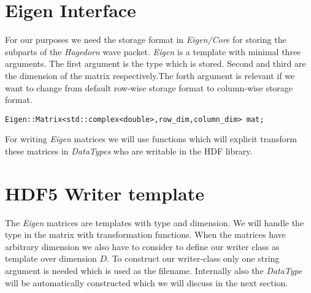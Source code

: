 \documentclass{article}
\begin{document}
\section{Eigen Interface}
For our purposes we need the storage format in \textit{Eigen/Core} for storing the subparts of the \textit{Hagedorn} wave packet. \textit{Eigen} is a template with minimal three arguments. The first argument is the type which is stored. Second and third are the dimension of the matrix respectively.The forth argument is relevant if we want to change from default row-wise storage format to column-wise storage format.
\begin{lstlisting}
Eigen::Matrix<std::complex<double>,row_dim,column_dim> mat;
\end{lstlisting}
For writing \textit{Eigen} matrices we will use functions which will explicit transform these matrices in \textit{DataTypes} who are writable in the HDF library.

\section{HDF5 Writer template}
The \textit{Eigen} matrices are templates with type and dimension. We will handle the type in the matrix with transformation functions. When the matrices have arbitrary dimension we also have to consider to define our writer class as template over dimension $D$. To construct our writer-class only one string argument is needed which is used as the filename. Internally also the \textit{DataType} will be automatically constructed which we will discuss in the next section.
\end{document}
